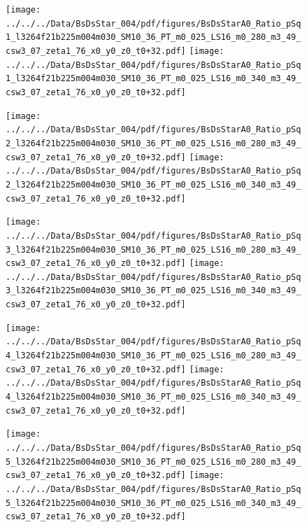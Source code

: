 \documentclass[a4paper,10pt]{article}
\begin{document}
\begin{figure}[p]
 \texttt{[image: ../../../Data/BsDsStar\_004/pdf/figures/BsDsStarA0\_Ratio\_pSq1\_l3264f21b225m004m030\_SM10\_36\_PT\_m0\_025\_LS16\_m0\_280\_m3\_49\_csw3\_07\_zeta1\_76\_x0\_y0\_z0\_t0+32.pdf]} 
 \texttt{[image: ../../../Data/BsDsStar\_004/pdf/figures/BsDsStarA0\_Ratio\_pSq1\_l3264f21b225m004m030\_SM10\_36\_PT\_m0\_025\_LS16\_m0\_340\_m3\_49\_csw3\_07\_zeta1\_76\_x0\_y0\_z0\_t0+32.pdf]} 
 \end{figure}
\begin{figure}[p]
 \texttt{[image: ../../../Data/BsDsStar\_004/pdf/figures/BsDsStarA0\_Ratio\_pSq2\_l3264f21b225m004m030\_SM10\_36\_PT\_m0\_025\_LS16\_m0\_280\_m3\_49\_csw3\_07\_zeta1\_76\_x0\_y0\_z0\_t0+32.pdf]} 
 \texttt{[image: ../../../Data/BsDsStar\_004/pdf/figures/BsDsStarA0\_Ratio\_pSq2\_l3264f21b225m004m030\_SM10\_36\_PT\_m0\_025\_LS16\_m0\_340\_m3\_49\_csw3\_07\_zeta1\_76\_x0\_y0\_z0\_t0+32.pdf]} 
 \end{figure}
\begin{figure}[p]
 \texttt{[image: ../../../Data/BsDsStar\_004/pdf/figures/BsDsStarA0\_Ratio\_pSq3\_l3264f21b225m004m030\_SM10\_36\_PT\_m0\_025\_LS16\_m0\_280\_m3\_49\_csw3\_07\_zeta1\_76\_x0\_y0\_z0\_t0+32.pdf]} 
 \texttt{[image: ../../../Data/BsDsStar\_004/pdf/figures/BsDsStarA0\_Ratio\_pSq3\_l3264f21b225m004m030\_SM10\_36\_PT\_m0\_025\_LS16\_m0\_340\_m3\_49\_csw3\_07\_zeta1\_76\_x0\_y0\_z0\_t0+32.pdf]} 
 \end{figure}
\clearpage
\begin{figure}[p]
 \texttt{[image: ../../../Data/BsDsStar\_004/pdf/figures/BsDsStarA0\_Ratio\_pSq4\_l3264f21b225m004m030\_SM10\_36\_PT\_m0\_025\_LS16\_m0\_280\_m3\_49\_csw3\_07\_zeta1\_76\_x0\_y0\_z0\_t0+32.pdf]} 
 \texttt{[image: ../../../Data/BsDsStar\_004/pdf/figures/BsDsStarA0\_Ratio\_pSq4\_l3264f21b225m004m030\_SM10\_36\_PT\_m0\_025\_LS16\_m0\_340\_m3\_49\_csw3\_07\_zeta1\_76\_x0\_y0\_z0\_t0+32.pdf]} 
 \end{figure}
\begin{figure}[p]
 \texttt{[image: ../../../Data/BsDsStar\_004/pdf/figures/BsDsStarA0\_Ratio\_pSq5\_l3264f21b225m004m030\_SM10\_36\_PT\_m0\_025\_LS16\_m0\_280\_m3\_49\_csw3\_07\_zeta1\_76\_x0\_y0\_z0\_t0+32.pdf]} 
 \texttt{[image: ../../../Data/BsDsStar\_004/pdf/figures/BsDsStarA0\_Ratio\_pSq5\_l3264f21b225m004m030\_SM10\_36\_PT\_m0\_025\_LS16\_m0\_340\_m3\_49\_csw3\_07\_zeta1\_76\_x0\_y0\_z0\_t0+32.pdf]} 
 \end{figure}
\clearpage
\end{document}
